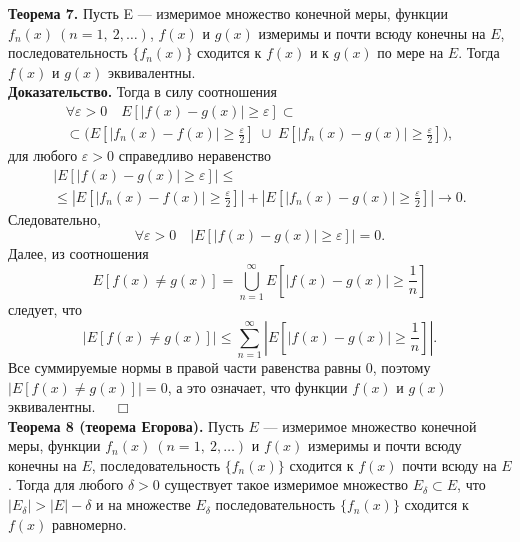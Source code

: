 \documentclass[12pt,a4paper, titlepage]{article}
\begin{document}
\textbf{Теорема 7.} Пусть E --- измеримое множество конечной меры, функции $f_n(x) \ (n = 1,\ 2,\dots)$, $f(x)$ и $g(x)$ измеримы и почти всюду конечны на $E$, последовательность $\lbrace f_n(x) \rbrace$ сходится к $f(x)$ и к $g(x)$ по мере на $E$. Тогда $f(x)$ и $g(x)$ эквивалентны.\\
\textbf{Доказательство.} %
Тогда в силу соотношения
\begin{multline*}
\forall \varepsilon > 0 \quad E[|f(x)-g(x)| \geqslant \varepsilon] \subset \\
\subset \biggl( E \left[|f_n(x) - f(x)| \geqslant \frac \varepsilon 2 \right] \; \cup \; E\left[|f_n(x)-g(x)| \geqslant \frac \varepsilon 2 \right] \biggr),
\end{multline*}
для любого $\varepsilon > 0$ справедливо неравенство
\begin{multline*}
\left| E[|f(x)-g(x)| \geqslant \varepsilon] \right| \leqslant \\
\leqslant \left| E \left[|f_n(x) - f(x)| \geqslant \frac \varepsilon 2 \right] \right| + \left| E \left[|f_n(x) - g(x)| \geqslant \frac \varepsilon 2 \right] \right| \to 0.
\end{multline*}
Следовательно,
$$
\forall \varepsilon > 0 \quad \left| E[|f(x)-g(x)| \geqslant \varepsilon] \right| = 0.
$$
Далее, из соотношения
$$
E[f(x)\neq g(x)] = \bigcup_{n=1}^\infty E\left[|f(x) - g(x)| \geqslant \frac 1 n\right]
$$
следует, что
$$
|E[f(x)\neq g(x)]| \leqslant \sum_{n=1}^\infty \left| E\left[|f(x) - g(x)| \geqslant \frac 1 n\right] \right|.
$$
Все суммируемые нормы в правой части равенства равны 0, поэтому $|E[f(x)\neq g(x)]| = 0$, а это означает, что функции $f(x)$ и $g(x)$ эквивалентны. $\quad \Box$\\

\textbf{Теорема 8 (теорема Егорова).} Пусть $E$ --- измеримое множество конечной меры, функции $f_n(x) \ (n = 1,\ 2,\dots)$ и $f(x)$ измеримы и почти всюду конечны на $E$, последовательность $\lbrace f_n(x) \rbrace$ сходится к $f(x)$ почти всюду на $E$. Тогда для любого $\delta > 0$ существует такое измеримое множество $E_\delta \subset E$, что $|E_\delta| > |E| - \delta$ и на множестве $E_\delta$ последовательность $\lbrace f_n(x) \rbrace$ сходится к $f(x)$ равномерно.\\
\end{document}
